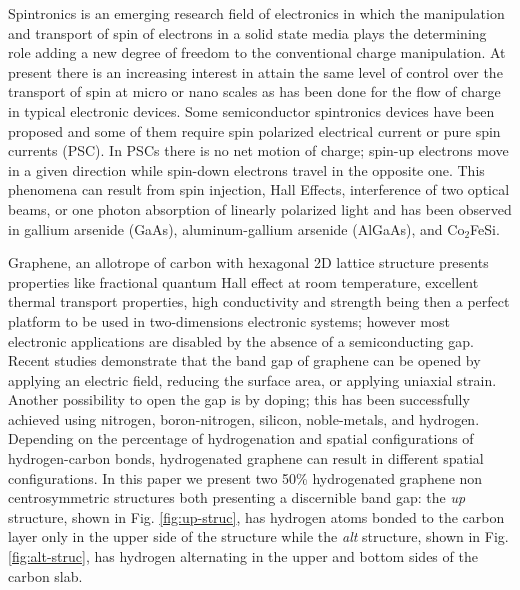 \documentclass[prb,11pt,tightenlines,twocolumn,aps]{revtex4-1}
\begin{document}
{
\color{blue}
Spintronics is an emerging research field of electronics in which the
manipulation and transport of spin of electrons in a solid state 
media plays the determining role adding a new degree of freedom to the
conventional charge manipulation.\cite{wolfSC04,fabianAPS07}
% 
At present there is an increasing interest in attain the same level of control
over the transport of spin at micro or nano scales as has been done for the flow
of charge in typical electronic devices.\cite{awschalomNP2007} Some
semiconductor spintronics devices have been proposed \cite{majumdarAPL06,
dattaAPL90} and some of them require spin polarized electrical current
\cite{awschalomSSBM13} or pure spin currents (PSC). In PSCs there is no net
motion of charge; spin-up electrons move in a given direction while spin-down
electrons travel in the opposite one. This phenomena can result from spin
injection,\cite{malPRB03} Hall Effects,\cite{sinovaPRB04} interference of two
optical beams,\cite{bhatPRL00, najmaiePRB03} or one photon absorption of
linearly polarized light\cite{bhatPRL05} and has been observed in
gallium arsenide (GaAs),\cite{zhaoPRL2006, stevensPRL03} aluminum-gallium
arsenide (AlGaAs),\cite{stevensPRL03} and Co$_2$FeSi.\cite{kimuraNGPAM12}

% 
Graphene, an allotrope of carbon with hexagonal 2D lattice structure presents
properties like fractional quantum Hall effect at room temperature, excellent
thermal transport properties, high conductivity and strength \cite{geimNM07,
reinaNL08, novoselov2S07, balandinNL08} being then a perfect platform to be used
in two-dimensions electronic systems; however most electronic applications are
disabled by the absence of a semiconducting gap. Recent studies demonstrate that
the band gap of graphene can be opened by applying an electric
field,\cite{zhangN09} reducing the surface area,\cite{hanPRL07} or applying
uniaxial strain.\cite{niACSN08} Another possibility to open the gap is by
doping; this has been successfully achieved using nitrogen,\cite{weiNL2009}
boron-nitrogen,\cite{guoIJ11} silicon,\cite{colettiPRB10} noble-metals, and
hydrogen.\cite{eliasS09, guisingerNL09, samarakoonACSN10}
% 
Depending on the percentage of hydrogenation and spatial configurations of
hydrogen-carbon bonds, hydrogenated graphene can result in different spatial
configurations.
% 
In this paper we present two 50\% hydrogenated graphene non centrosymmetric
structures both presenting a discernible band gap: the \emph{up} structure,
shown in Fig. \ref{fig:up-struc}, has hydrogen atoms bonded to the carbon layer
only in the upper side of the structure while the \emph{alt} structure, shown in
Fig. \ref{fig:alt-struc}, has hydrogen alternating in the upper and bottom sides
of the carbon slab.\cite{zapataPSB2016}

}
\end{document}
